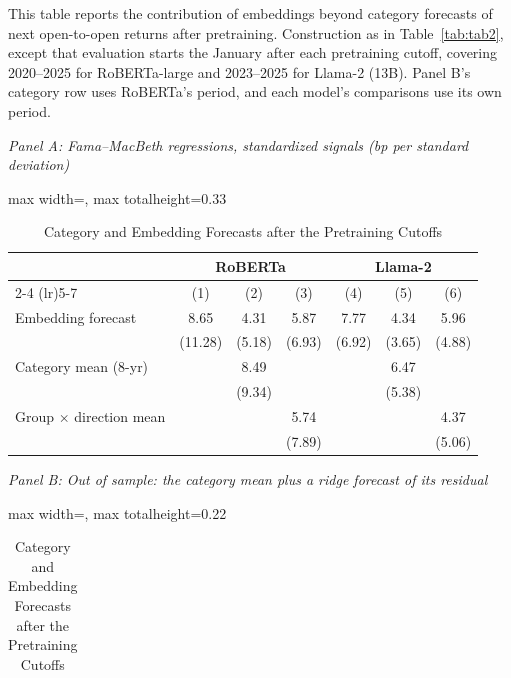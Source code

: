 \begin{table}[htbp]
\centering
\caption{Category and Embedding Forecasts after the Pretraining Cutoffs}
\label{tab:tabC_post_residual}
\begin{minipage}{\linewidth}\footnotesize
This table reports the contribution of embeddings beyond category forecasts of next open-to-open returns after pretraining. Construction as in Table~\ref{tab:tab2}, except that evaluation starts the January after each pretraining cutoff, covering 2020--2025 for RoBERTa-large and 2023--2025 for Llama-2 (13B). Panel B's category row uses RoBERTa's period, and each model's comparisons use its own period.
\end{minipage}
\medskip

{\footnotesize
\textit{Panel A: Fama--MacBeth regressions, standardized signals (bp per standard deviation)}\\[2pt]
\begin{adjustbox}{max width=\linewidth, max totalheight=0.33\textheight}
\begin{tabular}{lcccccc}
\toprule
 & \multicolumn{3}{c}{RoBERTa} & \multicolumn{3}{c}{Llama-2} \\
\cmidrule(lr){2-4} \cmidrule(lr){5-7}
 & (1) & (2) & (3) & (4) & (5) & (6) \\
\midrule
Embedding forecast & \phantom{(0}8.65\phantom{)} & \phantom{(}4.31\phantom{)} & \phantom{(}5.87\phantom{)} & \phantom{(}7.77\phantom{)} & \phantom{(}4.34\phantom{)} & \phantom{(}5.96\phantom{)} \\
 & (11.28) & (5.18) & (6.93) & (6.92) & (3.65) & (4.88) \\
Category mean (8-yr) &  & \phantom{(}8.49\phantom{)} &  &  & \phantom{(}6.47\phantom{)} &  \\
 &  & (9.34) &  &  & (5.38) &  \\
Group $\times$ direction mean &  &  & \phantom{(}5.74\phantom{)} &  &  & \phantom{(}4.37\phantom{)} \\
 &  &  & (7.89) &  &  & (5.06) \\
\bottomrule
\end{tabular}
\end{adjustbox}
\par\medskip
\textit{Panel B: Out of sample: the category mean plus a ridge forecast of its residual}\\[2pt]
\begin{adjustbox}{max width=\linewidth, max totalheight=0.22\textheight}
\begin{tabular}{lcccccccc}
\toprule

\end{tabular}
\end{adjustbox}}
\end{table}
